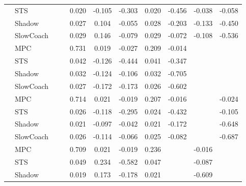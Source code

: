 \begin{tabular}{|l|l|*{9}{c|}}
                                                           & STS &       &        &     0.020 & -0.105 & -0.303 &  0.020 &  -0.456 &  -0.038 &   -0.058 \\
                                                           & Shadow &       &        &     0.027 &  0.104 & -0.055 &  0.028 &  -0.203 &  -0.133 &   -0.450 \\
                                                           & SlowCoach &       &        &     0.029 &  0.146 & -0.079 &  0.029 &  -0.072 &  -0.108 &   -0.536 \\
\midrule
[False, False, True, True, True, True, True, False, False] & MPC &       &        &     0.731 &  0.019 & -0.027 &  0.209 &  -0.014 &      &       \\
                                                           & STS &       &        &     0.042 & -0.126 & -0.444 &  0.041 &  -0.347 &      &       \\
                                                           & Shadow &       &        &     0.032 & -0.124 & -0.106 &  0.032 &  -0.705 &      &       \\
                                                           & SlowCoach &       &        &     0.027 & -0.172 & -0.173 &  0.026 &  -0.602 &      &       \\
\midrule
[False, False, True, True, True, True, True, False, True] & MPC &       &        &     0.714 &  0.021 & -0.019 &  0.207 &  -0.016 &      &   -0.024 \\
                                                           & STS &       &        &     0.026 & -0.118 & -0.295 &  0.024 &  -0.432 &      &   -0.105 \\
                                                           & Shadow &       &        &     0.021 & -0.097 & -0.042 &  0.021 &  -0.172 &      &   -0.648 \\
                                                           & SlowCoach &       &        &     0.026 & -0.114 & -0.066 &  0.025 &  -0.082 &      &   -0.687 \\
\midrule
[False, False, True, True, True, True, False, True, False] & MPC &       &        &     0.709 &  0.021 & -0.019 &  0.236 &      &  -0.016 &       \\
                                                           & STS &       &        &     0.049 &  0.234 & -0.582 &  0.047 &      &  -0.087 &       \\
                                                           & Shadow &       &        &     0.019 &  0.173 & -0.178 &  0.021 &      &  -0.609 &       \\

\end{tabular}
